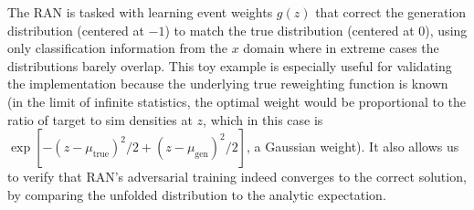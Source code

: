             The RAN is tasked with learning event weights $g(z)$ that correct the generation distribution (centered at $-1$) to match the true distribution (centered at 0), using only classification information from the $x$ domain where in extreme cases the distributions barely overlap.
            This toy example is especially useful for validating the implementation because the underlying true reweighting function is known (in the limit of infinite statistics, the optimal weight would be proportional to the ratio of target to sim densities at $z$, which in this case is $\exp[-(z-\mu_{\text{true}})^2/2 + (z-\mu_{\text{gen}})^2/2]$, a Gaussian weight). It also allows us to verify that RAN’s adversarial training indeed converges to the correct solution, by comparing the unfolded distribution to the analytic expectation.

